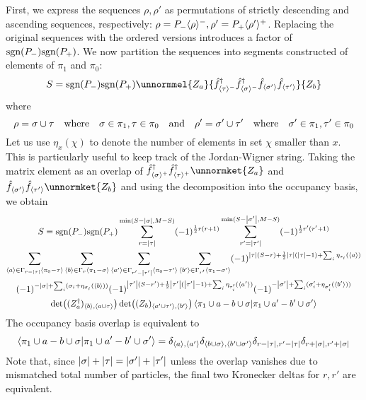 First, we express the sequences $\rho, \rho'$ as permutations of strictly descending and ascending sequences, respectively: $\rho=P_-\langle \rho\rangle^-,\rho'=P_+\langle \rho'\rangle^+$. Replacing the original sequences with the ordered versions introduces a factor of $\text{sgn}(P_-)\text{sgn}(P_+)$. We now partition the sequences into segments constructed of elements of $\pi_1$ and $\pi_0$:
\begin{equation}
S=\sgn(P_-)\sgn(P_+)\unnormmel{Z_a}{\hat{f}\hc_{\seq{\tau}^-}\hat{f}\hc_{\seq{\sigma}^-}\hat{f}_{\seq{\sigma'}}\hat{f}_{\seq{\tau'}}}{Z_b}
\end{equation}
where
\begin{equation}
\rho = \sigma \cup \tau\qq{where}\sigma\in\pi_1,\tau\in\pi_0\qq{and}\rho' = \sigma' \cup \tau'\qq{where}\sigma'\in\pi_1,\tau'\in\pi_0
\end{equation}
Let us use $\eta_x(\chi)$ to denote the number of elements in set $\chi$ smaller than $x$. This is particularly useful to keep track of the Jordan-Wigner string. Taking the matrix element as an overlap of $\hat{f}\hc_{\seq{\sigma}^+}\hat{f}\hc_{\seq{\tau}^+}\unnormket{Z_a}$ and $\hat{f}_{\seq{\sigma'}}\hat{f}_{\seq{\tau'}}\unnormket{Z_b}$ and using the decomposition into the occupancy basis, we obtain
\begin{multline}
	S = \text{sgn}(P_-)\text{sgn}(P_+)\sum_{r=\abs{\tau}}^{\min(S-\abs{\sigma}, M-S)}(-1)^{\frac{1}{2}r(r+1)}\sum_{r'=\abs{\tau'}}^{\min(S-\abs{\sigma'}, M-S)}(-1)^{\frac{1}{2}r'(r'+1)}\\
	\sum_{\langle a\rangle\in\Gamma_{r-\abs{\tau}}\langle \pi_0-\tau\rangle}\sum_{\langle b\rangle\in\Gamma_{r}\langle \pi_1-\sigma\rangle}\sum_{\langle a'\rangle\in\Gamma_{r'-\abs{\tau'}}\langle \pi_0-\tau'\rangle}\sum_{\langle b'\rangle\in\Gamma_{r'}\langle \pi_1-\sigma'\rangle}(-1)^{\abs{\tau}(S-r)+\frac{1}{2}\abs{\tau}(\abs{\tau}-1)+\sum_i\eta_{\tau_i}(\langle a\rangle)}\\
	(-1)^{-\abs{\sigma}+\sum_i(\sigma_i+\eta_{\sigma_i}(\langle b\rangle))}(-1)^{\abs{\tau'}(S-r')+\frac{1}{2}\abs{\tau'}(\abs{\tau'}-1)+\sum_i\eta_{\tau'_i}(\langle a'\rangle)}(-1)^{-\abs{\sigma'}+\sum_i(\sigma'_i+\eta_{\sigma'_i}(\langle b'\rangle))}\\
	\det((Z_a^\dagger)_{\langle b\rangle,\langle a\cup\tau\rangle})\det((Z_b)_{\langle a'\cup\tau'\rangle,\langle b'\rangle})\braket{\pi_1\cup a-b\cup\sigma}{\pi_1\cup a'-b'\cup\sigma'}
	\end{multline}
	The occupancy basis overlap is equivalent to
	\begin{equation}
	\braket{\pi_1\cup a-b\cup\sigma}{\pi_1\cup a'-b'\cup\sigma'}=\delta_{\langle a\rangle,\langle a'\rangle}\delta_{\langle b\cup\sigma\rangle,\langle b'\cup\sigma'\rangle}\delta_{r-\abs{\tau},r'-\abs{\tau}}\delta_{r+\abs{\sigma},r'+\abs{\sigma}}
	\end{equation}
	Note that, since $\abs{\sigma}+\abs{\tau}=\abs{\sigma'}+\abs{\tau'}$ unless the overlap vanishes due to mismatched total number of particles, the final two Kronecker deltas for $r,r'$ are equivalent.
	
